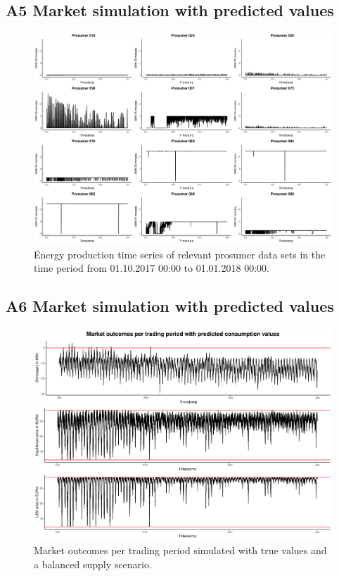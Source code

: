 \subsection*{\hypertarget{AppA5:Figures:producer_all}{A5} Market simulation with predicted values}\label{AppA5:Figures:producer_all}

\begin{figure}
    \centering
    \includegraphics[width=\textwidt]{thesis/graphs/marketsimulation/producers_all.pdf}
    \caption[Energy production time series of relevant prosumer data sets]{Energy production time series of relevant prosumer data sets in the time period from 01.10.2017 00:00 to 01.01.2018 00:00. \quantnet\href{ }{}}
\end{figure}


\subsection*{\hypertarget{AppA6:Figures:marketsimulation_pred}{A6} Market simulation with predicted values}\label{AppA6:Figures:marketsimulation_pred}

\begin{figure}[htbp]
    \centering
    \includegraphics[width=\textwidth]{thesis/graphs/marketsimulation/marketoutcome_pred.pdf}
    \caption[Market outcomes simulated with balanced supply and predicted values]{Market outcomes per trading period simulated with true values and a balanced supply scenario. \quantnet\href{}{}}
\end{figure}

